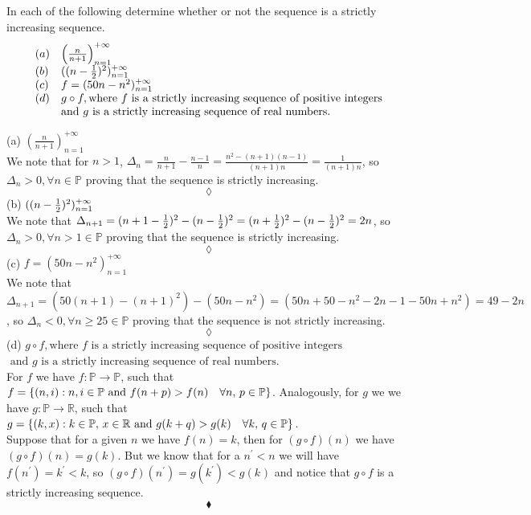 \subsection{}
\begin{tcolorbox}
 In each of the following determine whether or not the sequence is a strictly increasing sequence.
\begin{align*}
\begin{array}{ll}
 (a)&\left(\frac{n}{n+1}\right)^{+\infty}_{n=1} \\
 (b) &((n -\frac{1}{2})^2)^{+\infty}_{n=1} \\
 (c)&f = (50n - n^2)^{+\infty}_{n=1} \\
 (d) &g \circ f, \text{where }f \text{ is a strictly increasing sequence of positive integers}\\
 &\text{and } g \text{ is a strictly increasing sequence of real numbers}. 
\end{array}
\end{align*}
\end{tcolorbox}
$$ $$
(a) $\left(\frac{n}{n+1}\right)^{+\infty}_{n=1}$ \\
We note that for $n>1$,  $\Delta_n= \frac{n}{n+1}- \frac{n-1}{n}= \frac{n^2-(n+1)(n-1)}{(n+1)n}= \frac{1}{(n+1)n}$, so $\Delta_n >0, \forall  n \in\mathbb{P}$ proving that the sequence is strictly increasing.
$$\lozenge$$
(b) $((n -\frac{1}{2})^2)^{+\infty}_{n=1}$ \\
We note that $\Delta_{n+1}= (n+1  -\frac{1}{2})^2- (n -\frac{1}{2})^2= (n  +\frac{1}{2})^2- (n -\frac{1}{2})^2= 2n $, so $\Delta_n > 0, \forall  n>1 \in\mathbb{P}$ proving that the sequence is strictly increasing.
$$\lozenge$$
(c) $f = (50n - n^2)^{+\infty}_{n=1}$ \\
We note that $\Delta_{n+1}= (50(n+1) - (n+1)^2)- (50n - n^2)=(50n+50 - n^2-2n-1-50n+ n^2)= 49-2n $, so $\Delta_n < 0, \forall  n\ge 25 \in\mathbb{P}$ proving that the sequence is not strictly increasing.
$$\lozenge$$
(d) $g \circ f, \text{where }f \text{ is a strictly increasing sequence of positive integers}$\\
$\text{      and } g \text{ is a strictly increasing sequence of real numbers}$. \\
For  $f$ we have $f:\mathbb{P}\rightarrow \mathbb{P} $, such that $f=\{(n,i): n,i \in \mathbb{P}\text{ and } f(n+p) > f(n)\quad \forall n,\,p \in\mathbb{P}\}$. Analogously, for  $g$ we we have $g:\mathbb{P}\rightarrow \mathbb{R} $, such that $g=\{(k,x): k\in \mathbb{P}, \,x \in \mathbb{R}\text{ and } g(k+q) > g(k)\quad \forall k,\, q\in\mathbb{P}\}$. \\
Suppose that for a given $n$ we have $f(n)=k$, then for $(g\circ f)(n)$ we have $(g\circ f)(n)=g(k)$. But we know that for a $n^{'}< n$ we will have $f(n^{'})=k^{'}<k$, so $(g\circ f)(n^{'})=g(k^{'})< g(k^{})$ and notice that $g\circ f$ is a strictly increasing sequence.
$$\blacklozenge$$

